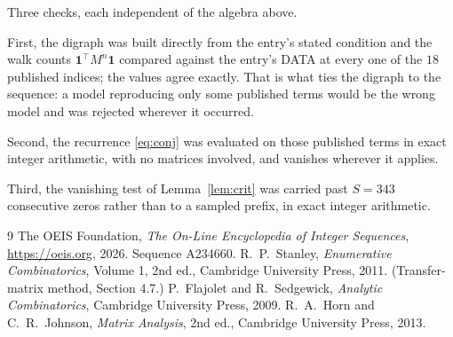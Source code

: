 \documentclass[11pt,a4paper]{article}
\theoremstyle{plain}
\theoremstyle{definition}
\begin{document}
Three checks, each independent of the algebra above.

First, the digraph was built directly from the entry's stated condition and the walk counts
$\mathbf{1}^{\!\top}M^{n}\mathbf{1}$ compared against the entry's DATA at every one of
the $18$ published indices; the values agree exactly. That is what ties the digraph to
the sequence: a model reproducing only some published terms would be the wrong model and
was rejected wherever it occurred.

Second, the recurrence \eqref{eq:conj} was evaluated on those published terms in exact
integer arithmetic, with no matrices involved, and vanishes wherever it applies.

Third, the vanishing test of Lemma~\ref{lem:crit} was carried past $S=343$ consecutive
zeros rather than to a sampled prefix, in exact integer arithmetic.

\begin{thebibliography}{9}
 The OEIS Foundation, \emph{The On-Line Encyclopedia of Integer
Sequences}, \url{https://oeis.org}, 2026. Sequence A234660.
 R.~P.~Stanley, \emph{Enumerative Combinatorics}, Volume 1, 2nd ed.,
Cambridge University Press, 2011. (Transfer-matrix method, Section 4.7.)
 P.~Flajolet and R.~Sedgewick, \emph{Analytic Combinatorics}, Cambridge
University Press, 2009.
 R.~A.~Horn and C.~R.~Johnson, \emph{Matrix Analysis}, 2nd ed., Cambridge
University Press, 2013.
\end{thebibliography}
\end{document}
